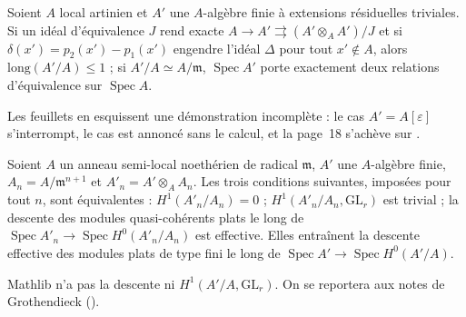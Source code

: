 \begin{encadre}
\begin{theoreme*}\nonverifie
Soient $A$ local artinien et $A'$ une $A$-algèbre finie à extensions résiduelles triviales. Si un idéal d'équivalence $J$ rend exacte $A \to A' \rightrightarrows (A' \otimes_A A')/J$ et si $\delta(x') = p_2(x') - p_1(x')$ engendre l'idéal $\Delta$ pour tout $x' \notin A$, alors $\mathrm{long}(A'/A) \leq 1$ ; si $A'/A \simeq A/\mathfrak m$, $\operatorname{Spec} A'$ porte exactement deux relations d'équivalence sur $\operatorname{Spec} A$.
\end{theoreme*}
\end{encadre}
{\small Les feuillets en esquissent une démonstration incomplète : le cas $A' = A[\varepsilon]$ s'interrompt, le cas  est annoncé sans le calcul, et la page~18 s'achève sur .\par}

\begin{encadre}
\begin{theoreme*}\nonverifie
Soient $A$ un anneau semi-local noethérien de radical $\mathfrak m$, $A'$ une $A$-algèbre finie, $A_n = A/\mathfrak m^{n+1}$ et $A'_n = A' \otimes_A A_n$. Les trois conditions suivantes, imposées pour tout $n$, sont équivalentes : $H^1(A'_n/A_n) = 0$ ; $H^1(A'_n/A_n, \mathrm{GL}_r)$ est trivial ; la descente des modules quasi-cohérents plats le long de $\operatorname{Spec} A'_n \to \operatorname{Spec} H^0(A'_n/A_n)$ est effective. Elles entraînent la descente effective des modules plats de type fini le long de $\operatorname{Spec} A' \to \operatorname{Spec} H^0(A'/A)$.
\end{theoreme*}
\end{encadre}
{\small Mathlib n'a pas la descente ni $H^1(A'/A, \mathrm{GL}_r)$. On se reportera aux notes de Grothendieck ().\par}
